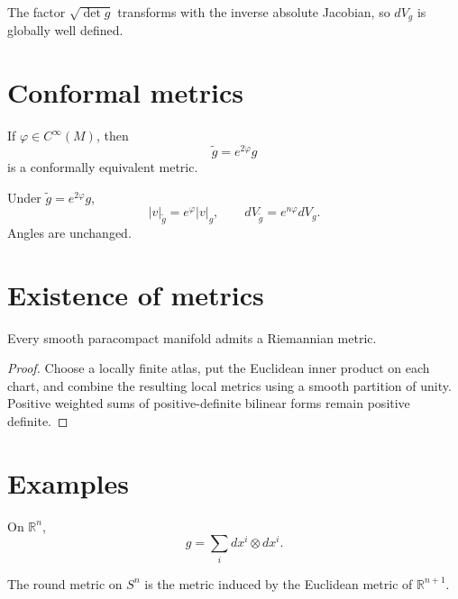 \begin{proposition}\label{prop:vii20-density-invariance}
The factor \(\sqrt{\det g}\) transforms with the inverse absolute Jacobian, so
\(dV_g\) is globally well defined.
\end{proposition}

\section{Conformal metrics}

\begin{definition}\label{def:vii20-conformal}
If \(\varphi\in C^\infty(M)\), then
\[
\widetilde g=e^{2\varphi}g
\]
is a conformally equivalent metric.
\end{definition}

\begin{proposition}\label{prop:vii20-conformal-scaling}
Under \(\widetilde g=e^{2\varphi}g\),
\[
|v|_{\widetilde g}=e^\varphi|v|_g,
\qquad
dV_{\widetilde g}=e^{n\varphi}dV_g.
\]
Angles are unchanged.
\end{proposition}

\section{Existence of metrics}

\begin{theorem}[Existence]\label{thm:vii20-existence}
Every smooth paracompact manifold admits a Riemannian metric.
\end{theorem}

\begin{proof}
Choose a locally finite atlas, put the Euclidean inner product on each chart, and
combine the resulting local metrics using a smooth partition of unity. Positive
weighted sums of positive-definite bilinear forms remain positive definite.
\end{proof}

\section{Examples}

\begin{example}\label{ex:vii20-euclidean}
On \(\mathbb R^n\),
\[
g=\sum_i dx^i\otimes dx^i.
\]
\end{example}

\begin{example}\label{ex:vii20-sphere}
The round metric on \(S^n\) is the metric induced by the Euclidean metric of
\(\mathbb R^{n+1}\).
\end{example}

